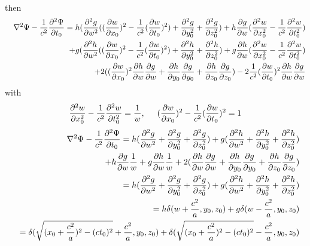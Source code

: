 \documentclass[prd,showpacs,preprint]{revtex4-1}
\begin{document}
\begin{appendix}
\begin{eqnarray}
\end{eqnarray}
then
\begin{eqnarray}
&&\nabla^2\Psi - \frac{1}{c^2}\frac{\partial^2\Psi}{\partial t_0} = h(\frac{\partial^2 g}{\partial w^2}((\frac{\partial w}{\partial x_0})^2-\frac{1}{c^2}(\frac{\partial w}{\partial t_0})^2)+\frac{\partial^2 g}{\partial y_0^2}+\frac{\partial^2 g}{\partial z_0^2})+h\frac{\partial g}{\partial w}(\frac{\partial^2 w}{\partial x_0^2}-\frac{1}{c^2}\frac{\partial^2 w}{\partial t_0^2})\nonumber\\
&&\hspace{5mm}+g(\frac{\partial^2 h}{\partial w^2}((\frac{\partial w}{\partial x_0})^2-\frac{1}{c^2}(\frac{\partial w}{\partial t_0})^2)+\frac{\partial^2 h}{\partial y_0^2}+\frac{\partial^2 h}{\partial z_0^2})+g\frac{\partial h}{\partial w}(\frac{\partial^2 w}{\partial x_0^2}-\frac{1}{c^2}\frac{\partial^2 w}{\partial t_0^2})\nonumber\\
&&\hspace{5mm}+ 2((\frac{\partial w}{\partial x_0})^2\frac{\partial h}{\partial w}\frac{\partial g}{\partial w}+\frac{\partial h}{\partial y_0}\frac{\partial g}{\partial y_0}+\frac{\partial h}{\partial z_0}\frac{\partial g}{\partial z_0})-2\frac{1}{c^2}(\frac{\partial w}{\partial t_0})^2\frac{\partial h}{\partial w}\frac{\partial g}{\partial w}
\end{eqnarray}
with
\begin{eqnarray}
\frac{\partial^2 w}{\partial x_0^2}-\frac{1}{c^2}\frac{\partial^2 w}{\partial t_0^2}=\frac{1}{w},\hspace{5mm}
(\frac{\partial w}{\partial x_0})^2-\frac{1}{c^2}(\frac{\partial w}{\partial t_0})^2=1
\end{eqnarray}
\begin{eqnarray}
&&\nabla^2\Psi - \frac{1}{c^2}\frac{\partial^2\Psi}{\partial t_0} = h(\frac{\partial^2 g}{\partial w^2}+\frac{\partial^2 g}{\partial y_0^2}+\frac{\partial^2 g}{\partial z_0^2})+g(\frac{\partial^2 h}{\partial w^2}+\frac{\partial^2 h}{\partial y_0^2}+\frac{\partial^2 h}{\partial z_0^2})\nonumber\\
&&\hspace{30mm}+h\frac{\partial g}{\partial w}\frac{1}{w}+g\frac{\partial h}{\partial w}\frac{1}{w} + 2(\frac{\partial h}{\partial w}\frac{\partial g}{\partial w}+\frac{\partial h}{\partial y_0}\frac{\partial g}{\partial y_0}+\frac{\partial h}{\partial z_0}\frac{\partial g}{\partial z_0})\nonumber\\
&&=h(\frac{\partial^2 g}{\partial w^2}+\frac{\partial^2 g}{\partial y_0^2}+\frac{\partial^2 g}{\partial z_0^2})+g(\frac{\partial^2 h}{\partial w^2}+\frac{\partial^2 h}{\partial y_0^2}+\frac{\partial^2 h}{\partial z_0^2})\nonumber\\
&&=h\delta(w+\frac{c^2}{a},y_0,z_0)+g\delta(w-\frac{c^2}{a},y_0,z_0)\\
&&=\delta(\sqrt{(x_0+\frac{c^2}{a})^2-(ct_0)^2}+\frac{c^2}{a},y_0,z_0) + \delta(\sqrt{(x_0+\frac{c^2}{a})^2-(ct_0)^2}-\frac{c^2}{a},y_0,z_0)\nonumber
\end{eqnarray}
\end{appendix}
\end{document}
